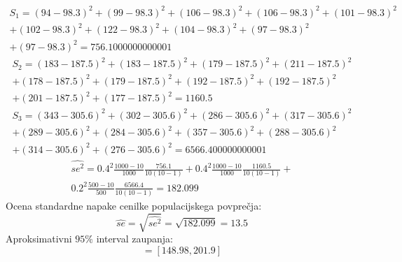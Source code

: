 \documentclass[a4paper]{article}
\begin{document}
\begin{multline*}
S_1 = (94 - 98.3)^2 + (99 - 98.3)^2 + (106 - 98.3)^2 + (106 - 98.3)^2 + (101 - 98.3)^2  \\
 + (102 - 98.3)^2 + (122 - 98.3)^2 + (104 - 98.3)^2 + (97 - 98.3)^2 \\
+ (97 - 98.3)^2 = 756.1000000000001
\end{multline*}
\begin{multline*}
S_2 = (183 - 187.5)^2 + (183 - 187.5)^2 + (179 - 187.5)^2 + (211 - 187.5)^2  \\ + (178 - 187.5)^2 + (179 - 187.5)^2 + (192 - 187.5)^2 + (192 - 187.5)^2 \\ + (201 - 187.5)^2 + (177 - 187.5)^2 = 1160.5
\end{multline*}
\begin{multline*}
S_3 = (343 - 305.6)^2 + (302 - 305.6)^2 + (286 - 305.6)^2 + (317 - 305.6)^2 \\ + (289 - 305.6)^2 + (284 - 305.6)^2 + (357 - 305.6)^2 + (288 - 305.6)^2 \\ + (314 - 305.6)^2 + (276 - 305.6)^2 = 6566.400000000001
\end{multline*}
\begin{multline*}
\widehat{ se^2 }= 0.4^2 \frac{1000-10}{1000} \frac{756.1}{10(10-1)} +  0.4^2 \frac{1000-10}{1000} \frac{1160.5}{10(10-1)} + \\ 0.2^2 \frac{500-10}{500} \frac{6566.4}{10(10-1)} = 182.099
\end{multline*}
Ocena standardne napake cenilke populacijskega povprečja:
 \begin{equation*}
\hat{se}= \sqrt{\widehat{ se^2 }} = \sqrt{182.099} = 13.5
\end{equation*}
Aproksimativni $95\%$ interval zaupanja:
 \begin{equation*}
[\hat{\mu} - Z_{\alpha}\times\hat{se}, \hat{\mu} + Z_{\alpha}\times\hat{se}] = [148.98, 201.9]
\end{equation*} 
\end{document}
